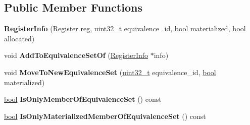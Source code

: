 \subsection*{Public Member Functions}
\begin{DoxyCompactItemize}
\item 
\mbox{\label{classv8_1_1internal_1_1interpreter_1_1BytecodeRegisterOptimizer_1_1RegisterInfo_a29d31d98dd5b43c40db37b5bdb92a83c}} 
{\bfseries Register\+Info} (\mbox{\hyperlink{classv8_1_1internal_1_1interpreter_1_1Register}{Register}} reg, \mbox{\hyperlink{classuint32__t}{uint32\+\_\+t}} equivalence\+\_\+id, \mbox{\hyperlink{classbool}{bool}} materialized, \mbox{\hyperlink{classbool}{bool}} allocated)
\item 
\mbox{\label{classv8_1_1internal_1_1interpreter_1_1BytecodeRegisterOptimizer_1_1RegisterInfo_af4a62f6fa5077de5b424d904601e83ce}} 
void {\bfseries Add\+To\+Equivalence\+Set\+Of} (\mbox{\hyperlink{classv8_1_1internal_1_1interpreter_1_1BytecodeRegisterOptimizer_1_1RegisterInfo}{Register\+Info}} $\ast$info)
\item 
\mbox{\label{classv8_1_1internal_1_1interpreter_1_1BytecodeRegisterOptimizer_1_1RegisterInfo_a47e04a235d3d6de1ca9300c609a4de21}} 
void {\bfseries Move\+To\+New\+Equivalence\+Set} (\mbox{\hyperlink{classuint32__t}{uint32\+\_\+t}} equivalence\+\_\+id, \mbox{\hyperlink{classbool}{bool}} materialized)
\item 
\mbox{\label{classv8_1_1internal_1_1interpreter_1_1BytecodeRegisterOptimizer_1_1RegisterInfo_ae0b6908dee8cf14f3dc08c8e4975ef71}} 
\mbox{\hyperlink{classbool}{bool}} {\bfseries Is\+Only\+Member\+Of\+Equivalence\+Set} () const
\item 
\mbox{\label{classv8_1_1internal_1_1interpreter_1_1BytecodeRegisterOptimizer_1_1RegisterInfo_aa359eb46c72106897d56157d5aaf8fb4}} 
\mbox{\hyperlink{classbool}{bool}} {\bfseries Is\+Only\+Materialized\+Member\+Of\+Equivalence\+Set} () const

\end{DoxyCompactItemize}
